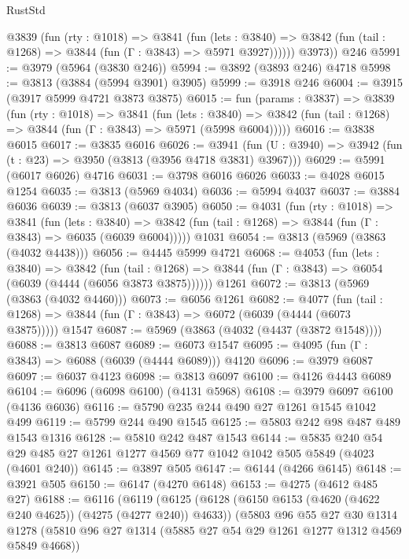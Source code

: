 \begin{lexlean}{RustStd}
\begin{coremodule}
{\begin{coremodule}
{{{{{{{{{{{{{{{{{{{{{{{{{{{{{{{{{{{          @3839
            (fun (rty : @1018) =>
            @3841
              (fun (lets : @3840) =>
              @3842 (fun (tail : @1268) => @3844 (fun (Γ : @3843) => @5971 @3927))))))
        @3973))
    @246
@5991 := @3979 (@5964 (@3830 @246))
@5994 := @3892 (@3893 @246) @4718
@5998 := @3813 (@3884 (@5994 @3901) @3905)
@5999 := @3918 @246
@6004 := @3915 (@3917 @5999 @4721 @3873 @3875)
@6015 := fun (params : @3837) =>
  @3839
    (fun (rty : @1018) =>
    @3841
      (fun (lets : @3840) =>
      @3842 (fun (tail : @1268) => @3844 (fun (Γ : @3843) => @5971 (@5998 @6004)))))
@6016 := @3838 @6015
@6017 := @3835 @6016
@6026 := @3941 (fun (U : @3940) => @3942 (fun (t : @23) => @3950 (@3813 (@3956 @4718 @3831) @3967)))
@6029 := @5991 (@6017 @6026) @4716
@6031 := @3798 @6016 @6026
@6033 := @4028 @6015 @1254
@6035 := @3813 (@5969 @4034)
@6036 := @5994 @4037
@6037 := @3884 @6036
@6039 := @3813 (@6037 @3905)
@6050 := @4031
    (fun (rty : @1018) =>
    @3841
      (fun (lets : @3840) =>
      @3842 (fun (tail : @1268) => @3844 (fun (Γ : @3843) => @6035 (@6039 @6004)))))
    @1031
@6054 := @3813 (@5969 (@3863 (@4032 @4438)))
@6056 := @4445 @5999 @4721
@6068 := @4053
    (fun (lets : @3840) =>
    @3842
      (fun (tail : @1268) => @3844 (fun (Γ : @3843) => @6054 (@6039 (@4444 (@6056 @3873 @3875))))))
    @1261
@6072 := @3813 (@5969 (@3863 (@4032 @4460)))
@6073 := @6056 @1261
@6082 := @4077
    (fun (tail : @1268) => @3844 (fun (Γ : @3843) => @6072 (@6039 (@4444 (@6073 @3875)))))
    @1547
@6087 := @5969 (@3863 (@4032 (@4437 (@3872 @1548))))
@6088 := @3813 @6087
@6089 := @6073 @1547
@6095 := @4095 (fun (Γ : @3843) => @6088 (@6039 (@4444 @6089))) @4120
@6096 := @3979 @6087
@6097 := @6037 @4123
@6098 := @3813 @6097
@6100 := @4126 @4443 @6089
@6104 := @6096 (@6098 @6100) (@4131 @5968)
@6108 := @3979 @6097 @6100 (@4136 @6036)
@6116 := @5790 @235 @244 @490 @27 @1261 @1545 @1042 @499
@6119 := @5799 @244 @490 @1545
@6125 := @5803 @242 @98 @487 @489 @1543 @1316
@6128 := @5810 @242 @487 @1543
@6144 := @5835
    @240
    @54
    @29
    @485
    @27
    @1261
    @1277
    @4569
    @77
    @1042
    @1042
    @505
    @5849
    (@4023 (@4601 @240))
@6145 := @3897 @505
@6147 := @6144 (@4266 @6145)
@6148 := @3921 @505
@6150 := @6147 (@4270 @6148)
@6153 := @4275 (@4612 @485 @27)
@6188 := @6116
    (@6119
      (@6125
        (@6128 (@6150 @6153 (@4620 (@4622 @240 @4625)) (@4275 (@4277 @240)) @4633))
        (@5803
          @96
          @55
          @27
          @30
          @1314
          @1278
          (@5810 @96 @27 @1314 (@5885 @27 @54 @29 @1261 @1277 @1312 @4569 @5849 @4668))
}}}}}}}}}}}}}}}}}}}}}}}}}}}}}}}}}}}
\end{coremodule}}
\end{coremodule}
\end{lexlean}
